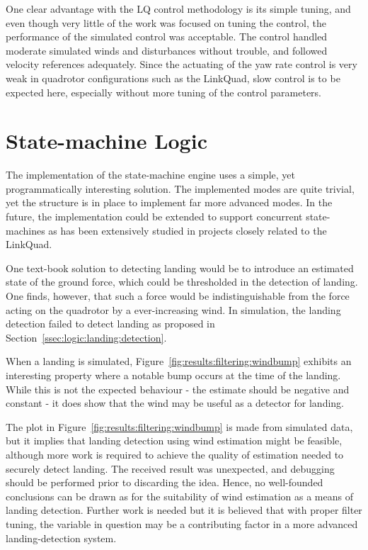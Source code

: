         One clear advantage with the LQ control methodology is its simple
        tuning, and even though very little of the work was focused on
        tuning the control, the performance of the simulated control was acceptable.
        The control handled moderate simulated winds and disturbances without trouble, and
        followed velocity references adequately.
        Since the actuating of the yaw rate control is very weak in
        quadrotor configurations such as the LinkQuad, slow control
        is to be expected here, especially without more tuning of the control
        parameters.

    \section{State-machine Logic}
        The implementation of the state-machine engine uses a simple, yet
        programmatically interesting solution. The implemented modes
        are quite trivial, yet the structure is in place to implement
        far more advanced modes. In the future, the implementation could
        be extended to support concurrent state-machines as has been
        extensively studied in projects closely related to the LinkQuad.

        One text-book solution to detecting landing would be to introduce
        an estimated state of the ground force, which could be thresholded
        in the detection of landing. One finds, however,
        that such a force would be indistinguishable from
        the force acting on the quadrotor by a ever-increasing wind.
        In simulation, the landing detection failed to detect landing
        as proposed in Section~\ref{ssec:logic:landing:detection}.

        When a landing is simulated, Figure~\ref{fig:results:filtering:windbump}
        exhibits an interesting property where a notable bump occurs at the
        time of the landing. While this is not the expected behaviour
        - the estimate should be negative and constant -
        it does show that the wind may be useful as a detector for landing.

        The plot in Figure~\ref{fig:results:filtering:windbump}
        is made from simulated data, but it implies that landing detection
        using wind estimation might be feasible, although more work is required
        to achieve the quality of estimation needed to securely detect landing.
        The received result was unexpected, and debugging should be performed prior
        to discarding the idea.
        Hence, no well-founded conclusions can be drawn as for the suitability
        of wind estimation as a means of landing detection. Further work
        is needed but it is believed that with proper filter tuning, the
        variable in question may be a contributing factor in a more advanced
        landing-detection system.
\pagebreak
